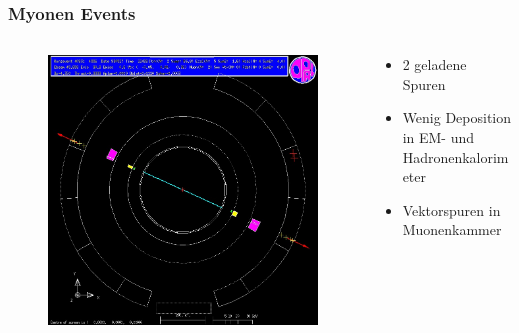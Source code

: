 \begin{frame}
	\frametitle{Myonen Events}
	\begin{columns}[T] %
		\begin{column}{.54\textwidth}
			\begin{figure}
				\centering
				\includegraphics[width=1.0\linewidth]{graphics/muonopal}
			\end{figure}
		\end{column}%
		\hfill%
		\begin{column}{.42\textwidth}
			\begin{center}
				\begin{itemize}
					\item 2 geladene Spuren
					\item Wenig Deposition in EM- und Hadronenkalorimeter
					\item Vektorspuren in Muonenkammer
				\end{itemize}
			\end{center}
		\end{column}%
	\end{columns}
	
\end{frame}
